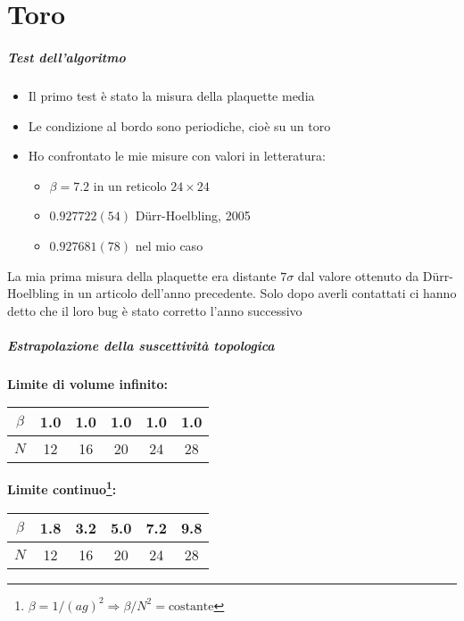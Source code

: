 \part{Toro}
\makepart

\begin{frame}
    \frametitle{Test dell'algoritmo}
    \begin{itemize}
        \item Il primo test è stato la misura della plaquette media
        \item Le condizione al bordo sono periodiche, cioè su un toro
        \item Ho confrontato le mie misure con valori in letteratura:
            \begin{itemize}
                \item[] {\color{fzjred} $\beta = 7.2$ in un reticolo $24\times24$}
                \item $0.927722(54)$ Dürr-Hoelbling, 2005
				\item $0.927681(78)$ nel mio caso
            \end{itemize}
    \end{itemize}
    \pause
    {\color{fzjgreen} La mia prima misura della plaquette era distante $7\sigma$ %
    dal valore ottenuto da Dürr-Hoelbling in un articolo dell'anno precedente. %
    Solo dopo averli contattati ci hanno detto che il loro bug è stato corretto %
    l'anno successivo}
\end{frame}

\begin{frame}
    \frametitle{Estrapolazione della suscettività topologica}
    \begin{center}
        \textbf{Limite di volume infinito:}\\
        \vspace{0.5em}
        \begin{tabular}{cccccc}
            \toprule
            $\beta$ & 1.0 & 1.0 & 1.0 & 1.0 & 1.0 \\\midrule
            $N$     & 12  & 16  & 20  & 24  & 28  \\\bottomrule
        \end{tabular}
    \end{center}
    \begin{center}
        \textbf{Limite continuo\footnote{$\beta=1/(ag)^2 %
        \Longrightarrow \beta/N^2 = \text{costante}$}:}\\
        \vspace{0.5em}
        \begin{tabular}{cccccc}
            \toprule
            $\beta$ & 1.8 & 3.2 & 5.0 & 7.2 & 9.8 \\\midrule
            $N$     & 12  & 16  & 20  & 24  & 28  \\\bottomrule
        \end{tabular}
    \end{center}
\end{frame}

